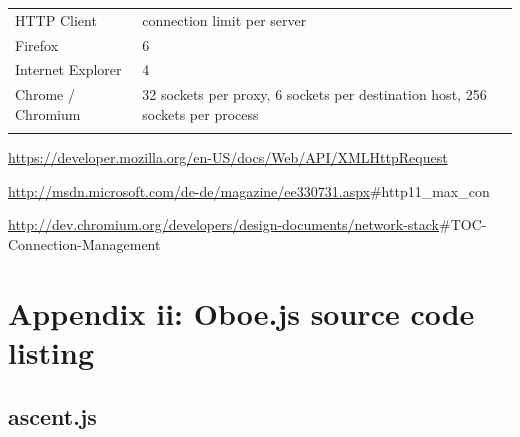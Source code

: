 \documentclass[12pt, ]{article}
\let\stdsection\section
\renewcommand\section{\newpage\stdsection}
\begin{document}
\begin{longtable}[c]{@{}ll@{}}
\hline\noalign{\medskip}
\begin{minipage}[b]{0.21\columnwidth}\raggedright
HTTP Client
\end{minipage} & \begin{minipage}[b]{0.27\columnwidth}\raggedright
connection limit per server
\end{minipage}
\\\noalign{\medskip}
\hline\noalign{\medskip}
\begin{minipage}[t]{0.21\columnwidth}\raggedright
Firefox
\end{minipage} & \begin{minipage}[t]{0.27\columnwidth}\raggedright
6
\end{minipage}
\\\noalign{\medskip}
\begin{minipage}[t]{0.21\columnwidth}\raggedright
Internet Explorer
\end{minipage} & \begin{minipage}[t]{0.27\columnwidth}\raggedright
4
\end{minipage}
\\\noalign{\medskip}
\begin{minipage}[t]{0.21\columnwidth}\raggedright
Chrome / Chromium
\end{minipage} & \begin{minipage}[t]{0.27\columnwidth}\raggedright
32 sockets per proxy, 6 sockets per destination host, 256 sockets per
process
\end{minipage}
\\\noalign{\medskip}
\hline
\end{longtable}

\url{https://developer.mozilla.org/en-US/docs/Web/API/XMLHttpRequest}

\url{http://msdn.microsoft.com/de-de/magazine/ee330731.aspx}\#http11\_max\_con

\url{http://dev.chromium.org/developers/design-documents/network-stack}\#TOC-Connection-Management

\section{Appendix ii: Oboe.js source code
listing}\label{appendix-ii-oboe.js-source-code-listing}

\subsection{ascent.js}\label{headerux5fascent}
\end{document}
